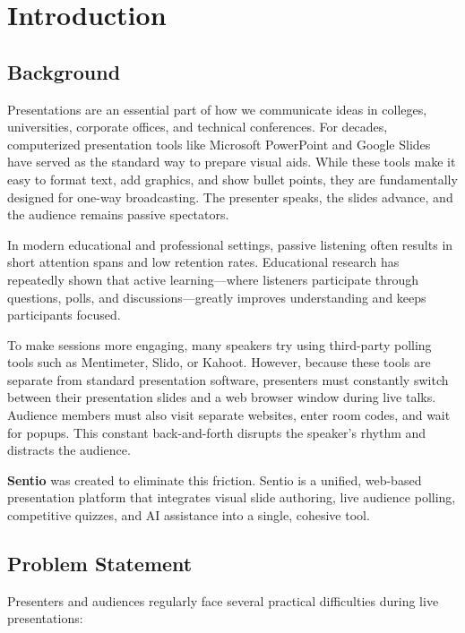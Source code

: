 \chapter{Introduction}

\section{Background}

Presentations are an essential part of how we communicate ideas in colleges, universities, corporate offices, and technical conferences. For decades, computerized presentation tools like Microsoft PowerPoint and Google Slides have served as the standard way to prepare visual aids. While these tools make it easy to format text, add graphics, and show bullet points, they are fundamentally designed for one-way broadcasting. The presenter speaks, the slides advance, and the audience remains passive spectators.

In modern educational and professional settings, passive listening often results in short attention spans and low retention rates. Educational research has repeatedly shown that active learning—where listeners participate through questions, polls, and discussions—greatly improves understanding and keeps participants focused.

To make sessions more engaging, many speakers try using third-party polling tools such as Mentimeter, Slido, or Kahoot. However, because these tools are separate from standard presentation software, presenters must constantly switch between their presentation slides and a web browser window during live talks. Audience members must also visit separate websites, enter room codes, and wait for popups. This constant back-and-forth disrupts the speaker's rhythm and distracts the audience.

\textbf{Sentio} was created to eliminate this friction. Sentio is a unified, web-based presentation platform that integrates visual slide authoring, live audience polling, competitive quizzes, and AI assistance into a single, cohesive tool.

\section{Problem Statement}

Presenters and audiences regularly face several practical difficulties during live presentations:


